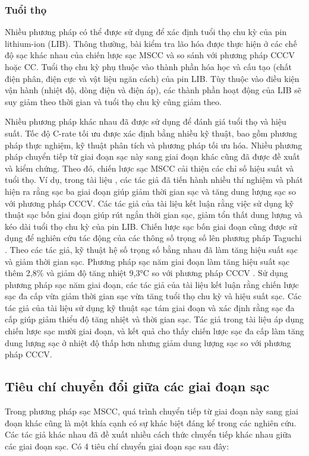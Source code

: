 \documentclass{thesis}
\begin{document}
\subsubsection{Tuổi thọ}

Nhiều phương pháp có thể được sử dụng để xác định tuổi thọ chu kỳ của pin lithium-ion (LIB). Thông thường, bài kiểm tra lão hóa được thực hiện ở các chế độ sạc khác nhau của chiến lược sạc MSCC và so sánh với phương pháp CCCV hoặc CC. Tuổi thọ chu kỳ phụ thuộc vào thành phần hóa học và cấu tạo (chất điện phân, điện cực và vật liệu ngăn cách) của pin LIB. Tùy thuộc vào điều kiện vận hành (nhiệt độ, dòng điện và điện áp), các thành phần hoạt động của LIB sẽ suy giảm theo thời gian và tuổi thọ chu kỳ cũng giảm theo.

Nhiều phương pháp khác nhau đã được sử dụng để đánh giá tuổi thọ và hiệu suất. Tốc độ C-rate tối ưu được xác định bằng nhiều kỹ thuật, bao gồm phương pháp thực nghiệm, kỹ thuật phân tích và phương pháp tối ưu hóa. Nhiều phương pháp chuyển tiếp từ giai đoạn sạc này sang giai đoạn khác cũng đã được đề xuất và kiểm chứng.
Theo đó, chiến lược sạc MSCC cải thiện các chỉ số hiệu suất và tuổi thọ. Ví dụ, trong tài liệu \cite{ref50}, các tác giả đã tiến hành nhiều thí nghiệm và phát hiện ra rằng sạc ba giai đoạn giúp giảm thời gian sạc và tăng dung lượng sạc so với phương pháp CCCV. Các tác giả của tài liệu \cite{ref58} kết luận rằng việc sử dụng kỹ thuật sạc bốn giai đoạn giúp rút ngắn thời gian sạc, giảm tổn thất dung lượng và kéo dài tuổi thọ chu kỳ của pin LIB. Chiến lược sạc bốn giai đoạn cũng được sử dụng để nghiên cứu tác động của các thông số trọng số lên phương pháp Taguchi \cite{ref30}. Theo các tác giả, kỹ thuật hệ số trọng số bằng nhau đã làm tăng hiệu suất sạc và giảm thời gian sạc. Phương pháp sạc năm giai đoạn làm tăng hiệu suất sạc thêm 2,8\% và giảm độ tăng nhiệt 9,3°C so với phương pháp CCCV \cite{ref76}. Sử dụng phương pháp sạc năm giai đoạn, các tác giả của tài liệu \cite{ref52} kết luận rằng chiến lược sạc đa cấp vừa giảm thời gian sạc vừa tăng tuổi thọ chu kỳ và hiệu suất sạc. Các tác giả của tài liệu \cite{ref80} sử dụng kỹ thuật sạc tám giai đoạn và xác định rằng sạc đa cấp giúp giảm thiểu độ tăng nhiệt và thời gian sạc. Tác giả trong tài liệu \cite{ref51} áp dụng chiến lược sạc mười giai đoạn, và kết quả cho thấy chiến lược sạc đa cấp làm tăng dung lượng sạc ở nhiệt độ thấp hơn nhưng giảm dung lượng sạc so với phương pháp CCCV.




\subsection{Tiêu chí chuyển đổi giữa các giai đoạn sạc}
Trong phương pháp sạc MSCC, quá trình chuyển tiếp từ giai đoạn này sang giai đoạn khác cũng là một khía cạnh có sự khác biệt đáng kể trong các nghiên cứu. Các tác giả khác nhau đã đề xuất nhiều cách thức chuyển tiếp khác nhau giữa các giai đoạn sạc. Có 4 tiêu chí chuyển giai đoạn sạc sau đây:
\end{document}
